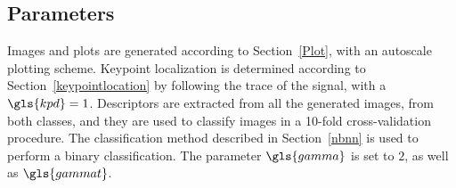 %
%

\subsection{Parameters}

Images and plots are generated according to Section~\ref{Plot}, with an autoscale plotting scheme.  Keypoint localization is determined according to Section~\ref{keypointlocation} by following the trace of the signal, with a $\gls{kpd} = 1$.   Descriptors are extracted from all the generated images, from both classes, and they are used to classify images in a 10-fold cross-validation procedure.  The classification method described in Section~\ref{nbnn} is used to perform a binary classification.  The parameter $\gls{gamma}$ is set to $2$, as well as $\gls{gammat}$.  



